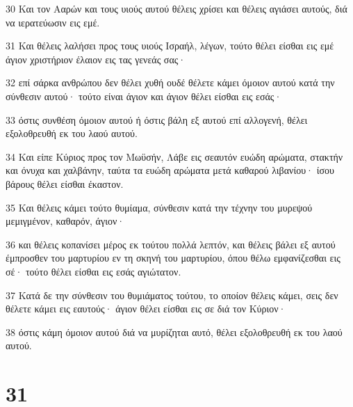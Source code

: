 \par 30 Και τον Ααρών και τους υιούς αυτού θέλεις χρίσει και θέλεις αγιάσει αυτούς, διά να ιερατεύωσιν εις εμέ.
\par 31 Και θέλεις λαλήσει προς τους υιούς Ισραήλ, λέγων, τούτο θέλει είσθαι εις εμέ άγιον χριστήριον έλαιον εις τας γενεάς σας·
\par 32 επί σάρκα ανθρώπου δεν θέλει χυθή ουδέ θέλετε κάμει όμοιον αυτού κατά την σύνθεσιν αυτού· τούτο είναι άγιον και άγιον θέλει είσθαι εις εσάς·
\par 33 όστις συνθέση όμοιον αυτού ή όστις βάλη εξ αυτού επί αλλογενή, θέλει εξολοθρευθή εκ του λαού αυτού.
\par 34 Και είπε Κύριος προς τον Μωϋσήν, Λάβε εις σεαυτόν ευώδη αρώματα, στακτήν και όνυχα και χαλβάνην, ταύτα τα ευώδη αρώματα μετά καθαρού λιβανίου· ίσου βάρους θέλει είσθαι έκαστον.
\par 35 Και θέλεις κάμει τούτο θυμίαμα, σύνθεσιν κατά την τέχνην του μυρεψού μεμιγμένον, καθαρόν, άγιον·
\par 36 και θέλεις κοπανίσει μέρος εκ τούτου πολλά λεπτόν, και θέλεις βάλει εξ αυτού έμπροσθεν του μαρτυρίου εν τη σκηνή του μαρτυρίου, όπου θέλω εμφανίζεσθαι εις σέ· τούτο θέλει είσθαι εις εσάς αγιώτατον.
\par 37 Κατά δε την σύνθεσιν του θυμιάματος τούτου, το οποίον θέλεις κάμει, σεις δεν θέλετε κάμει εις εαυτούς· άγιον θέλει είσθαι εις σε διά τον Κύριον·
\par 38 όστις κάμη όμοιον αυτού διά να μυρίζηται αυτό, θέλει εξολοθρευθή εκ του λαού αυτού.

\chapter{31}


